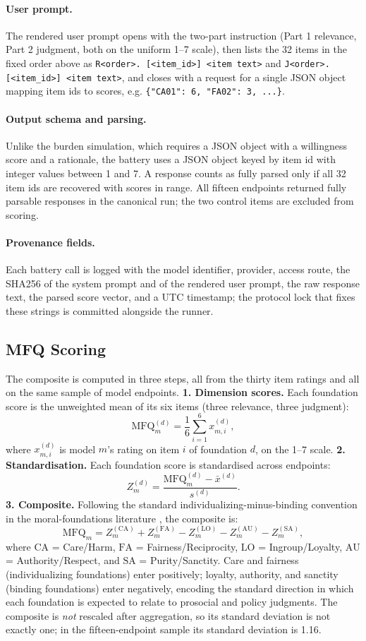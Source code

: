 \documentclass[11pt]{article}
\begin{document}
\paragraph{User prompt.} The rendered user prompt opens with the two-part instruction (Part 1 relevance, Part 2 judgment, both on the uniform 1--7 scale), then lists the 32 items in the fixed order above as \texttt{R<order>. [<item\_id>] <item text>} and \texttt{J<order>. [<item\_id>] <item text>}, and closes with a request for a single JSON object mapping item ids to scores, e.g. \texttt{\{"CA01": 6, "FA02": 3, ...\}}.
\paragraph{Output schema and parsing.} Unlike the burden simulation, which requires a JSON object with a willingness score and a rationale, the battery uses a JSON object keyed by item id with integer values between 1 and 7. A response counts as fully parsed only if all 32 item ids are recovered with scores in range. All fifteen endpoints returned fully parsable responses in the canonical run; the two control items are excluded from scoring.
\paragraph{Provenance fields.} Each battery call is logged with the model identifier, provider, access route, the SHA256 of the system prompt and of the rendered user prompt, the raw response text, the parsed score vector, and a UTC timestamp; the protocol lock that fixes these strings is committed alongside the runner.
\subsection*{MFQ Scoring}
The composite is computed in three steps, all from the thirty item ratings and all on the same sample of model endpoints.
\textbf{1. Dimension scores.} Each foundation score is the unweighted mean of its six items (three relevance, three judgment):
\[
\mathrm{MFQ}_{m}^{(d)} = \frac{1}{6}\sum_{i=1}^{6} x_{m,i}^{(d)},
\]
where $x_{m,i}^{(d)}$ is model $m$'s rating on item $i$ of foundation $d$, on the 1--7 scale.
\textbf{2. Standardisation.} Each foundation score is standardised across endpoints:
\[
Z^{(d)}_m = \frac{\mathrm{MFQ}^{(d)}_m - \bar{x}^{(d)}}{s^{(d)}}.
\]
\textbf{3. Composite.} Following the standard individualizing-minus-binding convention in the moral-foundations literature \citep{Graham2011}, the composite is:
\[
\mathrm{MFQ}_m = Z^{(\mathrm{CA})}_m + Z^{(\mathrm{FA})}_m - Z^{(\mathrm{LO})}_m - Z^{(\mathrm{AU})}_m - Z^{(\mathrm{SA})}_m,
\]
where $\mathrm{CA}$ = Care/Harm, $\mathrm{FA}$ = Fairness/Reciprocity, $\mathrm{LO}$ = Ingroup/Loyalty, $\mathrm{AU}$ = Authority/Respect, and $\mathrm{SA}$ = Purity/Sanctity. Care and fairness (individualizing foundations) enter positively; loyalty, authority, and sanctity (binding foundations) enter negatively, encoding the standard direction in which each foundation is expected to relate to prosocial and policy judgments. The composite is \emph{not} rescaled after aggregation, so its standard deviation is not exactly one; in the fifteen-endpoint sample its standard deviation is 1.16.
\end{document}

